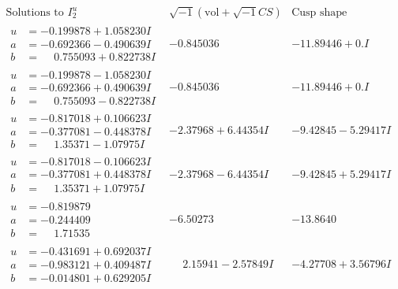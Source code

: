 \documentclass[1p]{elsarticle_modified}
\theoremstyle{definition}
\newcommand{\I}{\sqrt{-1}}
\begin{document}
$$\begin{array}{c|c|c}  
\text{Solutions to }I^u_{2}& \I (\text{vol} + \sqrt{-1}CS) & \text{Cusp shape}\\
 \hline 
\begin{aligned}
u &= -0.199878 + 1.058230 I \\
a &= -0.692366 - 0.490639 I \\
b &= \phantom{-}0.755093 + 0.822738 I\end{aligned}
 & -0.845036\phantom{ +0.000000I} & -11.89446 + 0. I\phantom{ +0.000000I} \\ \hline\begin{aligned}
u &= -0.199878 - 1.058230 I \\
a &= -0.692366 + 0.490639 I \\
b &= \phantom{-}0.755093 - 0.822738 I\end{aligned}
 & -0.845036\phantom{ +0.000000I} & -11.89446 + 0. I\phantom{ +0.000000I} \\ \hline\begin{aligned}
u &= -0.817018 + 0.106623 I \\
a &= -0.377081 - 0.448378 I \\
b &= \phantom{-}1.35371 - 1.07975 I\end{aligned}
 & -2.37968 + 6.44354 I & -9.42845 - 5.29417 I \\ \hline\begin{aligned}
u &= -0.817018 - 0.106623 I \\
a &= -0.377081 + 0.448378 I \\
b &= \phantom{-}1.35371 + 1.07975 I\end{aligned}
 & -2.37968 - 6.44354 I & -9.42845 + 5.29417 I \\ \hline\begin{aligned}
u &= -0.819879\phantom{ +0.000000I} \\
a &= -0.244409\phantom{ +0.000000I} \\
b &= \phantom{-}1.71535\phantom{ +0.000000I}\end{aligned}
 & -6.50273\phantom{ +0.000000I} & -13.8640\phantom{ +0.000000I} \\ \hline\begin{aligned}
u &= -0.431691 + 0.692037 I \\
a &= -0.983121 + 0.409487 I \\
b &= -0.014801 + 0.629205 I\end{aligned}
 & \phantom{-}2.15941 - 2.57849 I & -4.27708 + 3.56796 I \\ \hline\begin{aligned}

\end{aligned}
\end{array}$$
\end{document}
